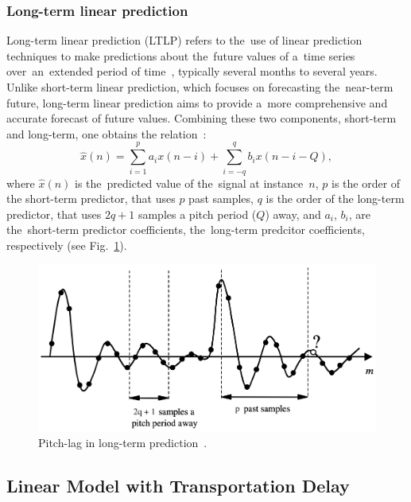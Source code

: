 \documentclass[12pt]{article}
\begin{document}
\subsubsection{Long-term linear prediction} \label{ltlp}
\noindent Long-term linear prediction (LTLP) refers to the~use of linear prediction techniques to make
predictions about the~future values of a~time series over~an~extended period of time~\cite{WOS:000266982600001},
typically several months to several years. Unlike short-term linear prediction, which focuses
on forecasting the~near-term future, long-term linear prediction aims to provide a~more
comprehensive and accurate forecast of future values. Combining these two components, short-term and long-term, one obtains the relation~\cite{vaidyanathan2007theory, WOS:A1990DY40800023}:
%
\begin{equation}\label{eq10}
    \hat{x}(n) = \sum_{i=1}^{p} a_i x(n-i) + \sum_{i=-q}^{q} b_i x(n-i-Q),
\end{equation}
%
where $\hat{x}(n)$ is the~predicted value of the~signal at instance~$n$,
$p$ is the order of the short-term predictor, that uses $p$ past samples, $q$
is the order of the long-term predictor, that uses $2q+1$ samples a pitch period ($Q$) away,
and $a_i$, $b_i$, are the~short-term predictor coefficients, the~long-term predcitor coefficients, respectively (see Fig.~\ref{fig1}).

%
\begin{center}
    \begin{figure}[!ht]
        \centering
        \includegraphics[width=\columnwidth]{shift}
        \caption{Pitch-lag in long-term prediction~\cite{WOS:000266982600001}.}
        \label{fig1}
    \end{figure}
\end{center}

\subsection{Linear Model with Transportation Delay}
\end{document}
